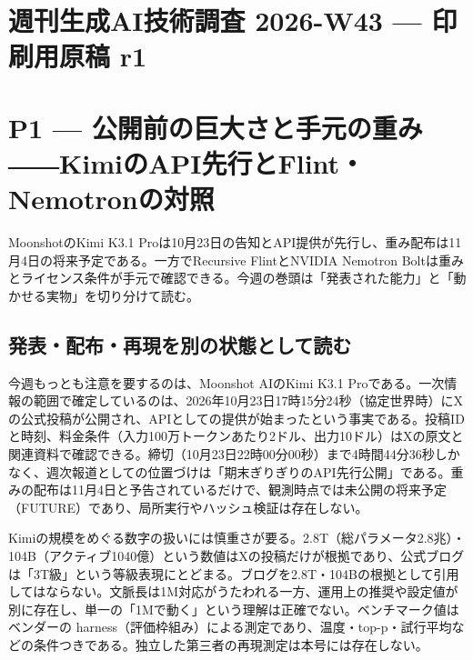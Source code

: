 \documentclass[lualatex,a4paper,10pt]{jlreq}
\begin{document}
\surveycover
\clearpage
\tableofcontents
\clearpage

\section*{週刊生成AI技術調査 2026-W43 --- 印刷用原稿 r1}
\label{sec:cover-title}


\section{P1 --- 公開前の巨大さと手元の重み――KimiのAPI先行とFlint・Nemotronの対照}
\label{sec:P1}


MoonshotのKimi K3.1 Proは10月23日の告知とAPI提供が先行し、重み配布は11月4日の将来予定である。一方でRecursive FlintとNVIDIA Nemotron Boltは重みとライセンス条件が手元で確認できる。今週の巻頭は「発表された能力」と「動かせる実物」を切り分けて読む。


\subsection*{発表・配布・再現を別の状態として読む}


今週もっとも注意を要するのは、Moonshot AIのKimi K3.1 Proである。一次情報の範囲で確定しているのは、2026年10月23日17時15分24秒（協定世界時）にXの公式投稿が公開され、APIとしての提供が始まったという事実である。投稿IDと時刻、料金条件（入力100万トークンあたり2ドル、出力10ドル）はXの原文と関連資料で確認できる。締切（10月23日22時00分00秒）まで4時間44分36秒しかなく、週次報道としての位置づけは「期末ぎりぎりのAPI先行公開」である。重みの配布は11月4日と予告されているだけで、観測時点では未公開の将来予定（FUTURE）であり、局所実行やハッシュ検証は存在しない。


Kimiの規模をめぐる数字の扱いには慎重さが要る。2.8T（総パラメータ2.8兆）・104B（アクティブ1040億）という数値はXの投稿だけが根拠であり、公式ブログは「3T級」という等級表現にとどまる。ブログを2.8T・104Bの根拠として引用してはならない。文脈長は1M対応がうたわれる一方、運用上の推奨や設定値が別に存在し、単一の「1Mで動く」という理解は正確でない。ベンチマーク値はベンダーの harness（評価枠組み）による測定であり、温度・top-p・試行平均などの条件つきである。独立した第三者の再現測定は本号には存在しない。
\end{document}
